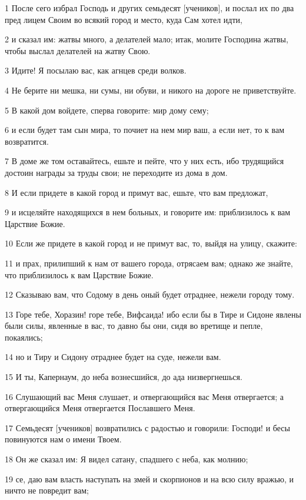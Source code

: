 \par 1 После сего избрал Господь и других семьдесят [учеников], и послал их по два пред лицем Своим во всякий город и место, куда Сам хотел идти,
\par 2 и сказал им: жатвы много, а делателей мало; итак, молите Господина жатвы, чтобы выслал делателей на жатву Свою.
\par 3 Идите! Я посылаю вас, как агнцев среди волков.
\par 4 Не берите ни мешка, ни сумы, ни обуви, и никого на дороге не приветствуйте.
\par 5 В какой дом войдете, сперва говорите: мир дому сему;
\par 6 и если будет там сын мира, то почиет на нем мир ваш, а если нет, то к вам возвратится.
\par 7 В доме же том оставайтесь, ешьте и пейте, что у них есть, ибо трудящийся достоин награды за труды свои; не переходите из дома в дом.
\par 8 И если придете в какой город и примут вас, ешьте, что вам предложат,
\par 9 и исцеляйте находящихся в нем больных, и говорите им: приблизилось к вам Царствие Божие.
\par 10 Если же придете в какой город и не примут вас, то, выйдя на улицу, скажите:
\par 11 и прах, прилипший к нам от вашего города, отрясаем вам; однако же знайте, что приблизилось к вам Царствие Божие.
\par 12 Сказываю вам, что Содому в день оный будет отраднее, нежели городу тому.
\par 13 Горе тебе, Хоразин! горе тебе, Вифсаида! ибо если бы в Тире и Сидоне явлены были силы, явленные в вас, то давно бы они, сидя во вретище и пепле, покаялись;
\par 14 но и Тиру и Сидону отраднее будет на суде, нежели вам.
\par 15 И ты, Капернаум, до неба вознесшийся, до ада низвергнешься.
\par 16 Слушающий вас Меня слушает, и отвергающийся вас Меня отвергается; а отвергающийся Меня отвергается Пославшего Меня.
\par 17 Семьдесят [учеников] возвратились с радостью и говорили: Господи! и бесы повинуются нам о имени Твоем.
\par 18 Он же сказал им: Я видел сатану, спадшего с неба, как молнию;
\par 19 се, даю вам власть наступать на змей и скорпионов и на всю силу вражью, и ничто не повредит вам;
